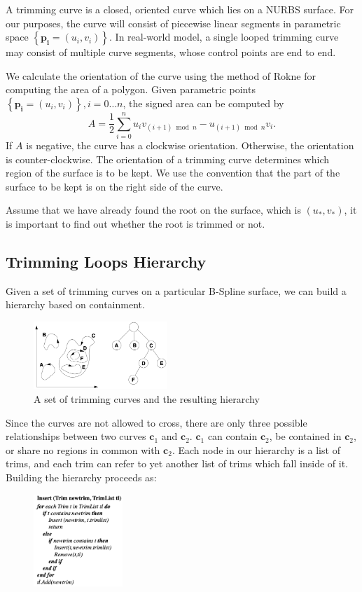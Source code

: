\documentclass[acmtog]{acmart}
\begin{document}
A trimming curve is a closed, oriented curve which lies on a NURBS surface. For our purposes, the curve will consist of piecewise linear segments in parametric space $\left\{\mathbf{p}_{\mathbf{i}}=\left(u_i, v_i\right)\right\}$. In real-world model, a single looped trimming curve may consist of multiple curve segments, whose control points are end to end.

We calculate the orientation of the curve using the method of Rokne for computing the area of a polygon. Given parametric points $\left\{\mathbf{p}_{\mathbf{i}}=\left(u_i, v_i\right)\right\}, i=0 \ldots n$, the signed area can be computed by
$$
A=\frac{1}{2} \sum_{i=0}^n u_i v_{(i+1) \bmod n}-u_{(i+1) \bmod n} v_i .
$$
If $A$ is negative, the curve has a clockwise orientation. Otherwise, the orientation is counter-clockwise. The orientation of a trimming curve determines which region of the surface is to be kept. We use the convention that the part of the surface to be kept is on the right side of the curve.

Assume that we have already found the root on the surface, which is $(u_*,v_*)$, it is important to find out whether the root is trimmed or not.

\subsection{Trimming Loops Hierarchy}
\hspace*{8pt}
Given a set of trimming curves on a particular B-Spline surface, we can build a hierarchy based on containment.
\begin{figure}[htbp]
    \centering
    \includegraphics[width=0.45\textwidth]{hie.png}
    \caption{A set of trimming curves and the resulting hierarchy}
\end{figure}

Since the curves are not allowed to cross, there are only three possible relationships between two curves $\mathbf{c}_1$ and $\mathbf{c}_2$. $\mathbf{c}_1$ can contain $\mathbf{c}_2$, be contained in $\mathbf{c}_2$, or share no regions in common with $\mathbf{c}_2$. Each node in our hierarchy is a list of trims, and each trim can refer to yet another list of trims which fall inside of it. Building the hierarchy proceeds as:
\begin{figure}[htbp]
    \centering
    \includegraphics[width=0.3\textwidth, height=0.3\textwidth]{algo1.png}
\end{figure}
\end{document}
